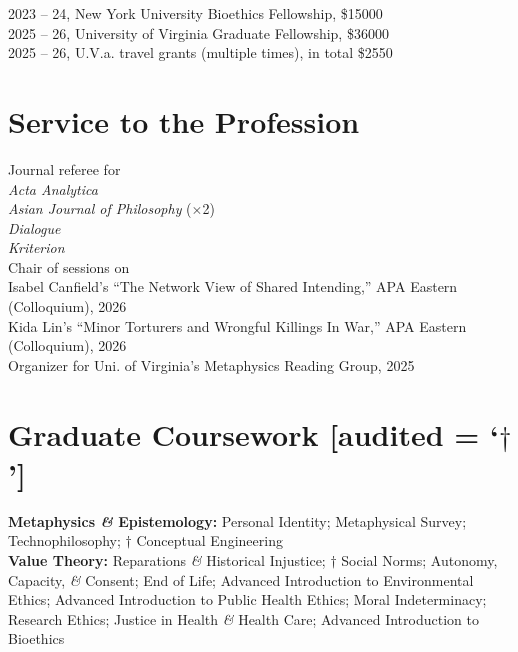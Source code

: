\documentclass[10pt]{article}
\begin{document}
2023 -- 24, New York University Bioethics Fellowship, \$15000\\
2025 -- 26, University of Virginia Graduate Fellowship, \$36000\\
2025 -- 26, U.V.a. travel grants (multiple times), in total \$2550

\section*{Service to the Profession}

\hangindent=0.8cm Journal referee for\\
\emph{Acta Analytica}\\
\emph{Asian Journal of Philosophy} (\begin{math}\times\end{math}2)\\
\emph{Dialogue}\\
\emph{Kriterion}\\

\hangindent=0.8cm Chair of sessions on\\
Isabel Canfield’s ``The Network View of Shared Intending,'' APA Eastern (Colloquium), 2026\\
Kida Lin’s ``Minor Torturers and Wrongful Killings In War,'' APA Eastern (Colloquium), 2026\\ 

\hangindent=0.8cm Organizer for Uni. of Virginia's Metaphysics Reading Group, 2025

\section*{Graduate Coursework \textnormal{\normalsize{[audited = `\begin{math}\dagger\end{math}']}}}

\hangindent=0.8cm \textbf{Metaphysics \emph{\&} Epistemology:} Personal Identity; Metaphysical Survey; Technophilosophy; \begin{math}\dagger\end{math} Conceptual Engineering\\

\hangindent=0.8cm \textbf{Value Theory:} Reparations \emph{\&} Historical Injustice; \begin{math}\dagger\end{math} Social Norms; Autonomy, Capacity, \emph{\&} Consent; End of Life; Advanced Introduction to Environmental Ethics; Advanced Introduction to Public Health Ethics; Moral Indeterminacy; Research Ethics; Justice in Health \emph{\&} Health Care; Advanced Introduction to Bioethics\\
\end{document}
